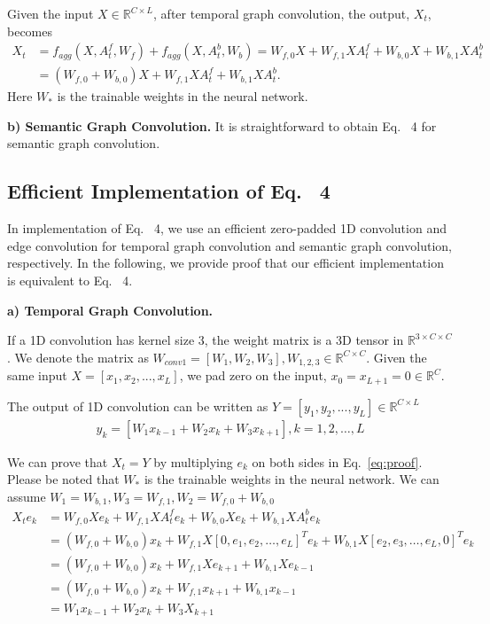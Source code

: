 \documentclass[10pt,twocolumn,letterpaper]{article}
\begin{document}
Given the input $X\in\mathbb{R}^{C\times L}$, after temporal graph convolution, the output, $X_t$, becomes
\begin{align} \label{eq:tgc}
    X_t &= f_{agg}(X,A_t^f,W_f) + f_{agg}(X,A_t^b,W_b) =W_{f,0} X + W_{f,1} X A_t^f + W_{b,0} X + W_{b,1} X A_t^b \nonumber\\
    & =(W_{f,0}+W_{b,0}) X + W_{f,1} X A_t^f + W_{b,1} X A_t^b .
\end{align}
Here $W_*$ is the trainable weights in the neural network. 


\noindent
\textbf{b) Semantic Graph Convolution.}  It is straightforward to obtain Eq.~{\color{red} 4} for semantic graph convolution.


\noindent
\subsection{Efficient Implementation of Eq.~{\color{red} 4}}

In implementation of Eq.~{\color{red} 4}, we use an efficient zero-padded 1D convolution and edge convolution for temporal graph convolution and semantic graph convolution, respectively. In the following, we provide proof that our efficient implementation is equivalent to Eq.~{\color{red} 4}.

\noindent
\textbf{a) Temporal Graph Convolution.}


If a 1D convolution has kernel size 3, the weight matrix is a 3D tensor in $\mathbb{R}^{3\times C \times C}$. We denote the matrix as $W_{conv1}= [W_1,W_2,W_3],W_{1,2,3}\in \mathbb{R}^{C\times C}$. 
Given the same input $X=[x_1, x_2,...,x_L]$, we pad zero on the input, $x_0=x_{L+1}=0\in \mathbb{R}^{C}$. 

The output of 1D convolution can be written as $Y=[y_1,y_2,...,y_L]\in \mathbb{R}^{C\times L}$  
\begin{align} \label{eq:y_k}
    y_k = [W_1 x_{k-1}+W_2 x_k+W_3x_{k+1}], k=1,2,\dots,L
\end{align}

We can prove that $X_t=Y$ by multiplying $e_k$ on both sides in Eq.~\ref{eq:proof}.  Please be noted that $W_*$ is the trainable weights in the neural network. We can assume $W_1=W_{b,1},W_3=W_{f,1}, W_2=W_{f,0}+W_{b,0}$
\begin{align} \label{eq:proof}
    X_te_k&=W_{f,0} Xe_k + W_{f,1} X A_t^fe_k + W_{b,0} Xe_k + W_{b,1} X A_t^be_k \nonumber\\
    &=(W_{f,0}+W_{b,0}) x_k + W_{f,1} X [0, e_1, e_2,\dots, e_L]^T e_k + W_{b,1} X [e_2,e_3,\dots, e_L, 0]^T e_k  \nonumber\\
    &=(W_{f,0}+W_{b,0}) x_k + W_{f,1} X e_{k+1} + W_{b,1} X e_{k-1} \nonumber\\
    &=(W_{f,0}+W_{b,0}) x_k + W_{f,1} x_{k+1} + W_{b,1} x_{k-1}  \nonumber\\
    &=W_1 x_{k-1}+W_2 x_k+W_3X_{k+1}
\end{align}
\end{document}

